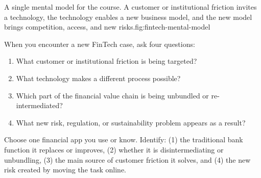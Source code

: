 \begin{utpfig}{A single mental model for the course. A customer or institutional friction invites a technology, the technology enables a new business model, and the new model brings competition, access, and new risks.}{fig:fintech-mental-model}
\end{utpfig}

When you encounter a new FinTech case, ask four questions:

\begin{enumerate}
  \item What customer or institutional friction is being targeted?
  \item What technology makes a different process possible?
  \item Which part of the financial value chain is being unbundled or re-intermediated?
  \item What new risk, regulation, or sustainability problem appears as a result?
\end{enumerate}

\begin{tryit}
Choose one financial app you use or know. Identify: (1) the traditional bank function it replaces or improves, (2) whether it is disintermediating or unbundling, (3) the main source of customer friction it solves, and (4) the new risk created by moving the task online.
\end{tryit}

